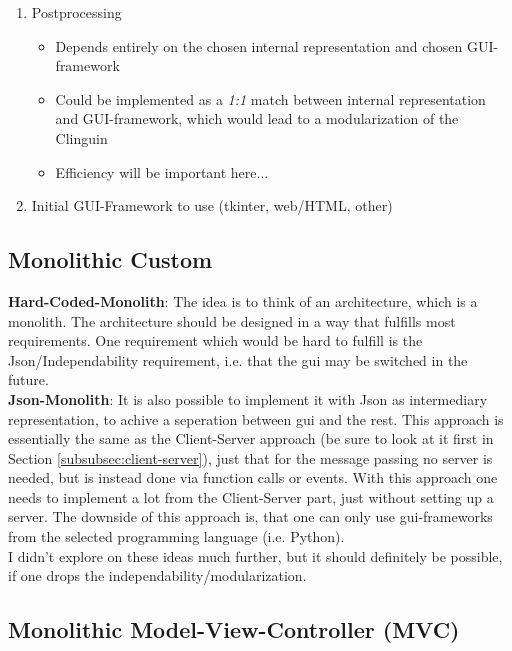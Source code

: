 \documentclass[12pt,a4paper]{article}
\newcommand{\<}[1]{\guilsinglleft}
\renewcommand{\>}[1]{\guilsinglright}
\begin{document}
\begin{enumerate}
\begin{itemize}
\begin{itemize}
        \end{itemize}
    \end{itemize}
    \item Postprocessing
    \begin{itemize}
        \item Depends entirely on the chosen internal representation and chosen GUI-framework
        \item Could be implemented as a \textit{1:1} match between internal representation and GUI-framework, which would lead to a modularization of the Clinguin
        \item Efficiency will be important here...
    \end{itemize}
    \item Initial GUI-Framework to use (tkinter, web/HTML, other)
\end{enumerate}


\subsection{Monolithic Custom}

\noindent \textbf{Hard-Coded-Monolith}: The idea is to think of an architecture, which is a monolith. The architecture should be designed in a way that fulfills most requirements. One requirement which would be hard to fulfill is the Json/Independability requirement, i.e. that the gui may be switched in the future.\\[1em]
\noindent \textbf{Json-Monolith}: It is also possible to implement it with Json as intermediary representation, to achive a seperation between gui and the rest. This approach is essentially the same as the Client-Server approach (be sure to look at it first in Section \ref{subsubsec:client-server}), just that for the message passing no server is needed, but is instead done via function calls or events. With this approach one needs to implement a lot from the Client-Server part, just without setting up a server. The downside of this approach is, that one can only use gui-frameworks from the selected programming language (i.e. Python).\\[1em]
I didn't explore on these ideas much further, but it should definitely be possible, if one drops the independability/modularization.

\subsection{Monolithic Model-View-Controller (MVC)}
\end{document}
